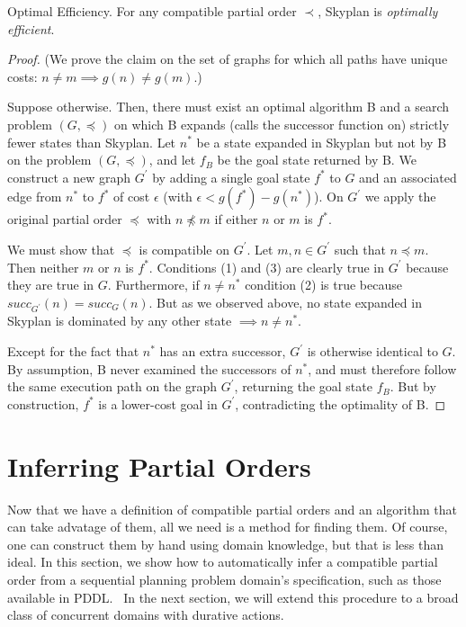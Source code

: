 \documentclass[letterpaper]{article}
\theoremstyle{plain} \newtheorem{theorem}{Theorem} \newtheorem{proposition}{Proposition} \newtheorem{lemma}{Lemma}
\theoremstyle{definition} \newtheorem{definition}{Definition} \newtheorem{conjecture}{Conjecture} \newtheorem*{example}{Example}
\theoremstyle{remark} \newtheorem*{remark}{Remark} \newtheorem*{note}{Note} \newtheorem{case}{Case}
\begin{document}
\begin{claim}{Optimal Efficiency.}\label{clm-optimally-efficient}
For any compatible partial order $\prec$, Skyplan is \emph{optimally efficient}.
\end{claim}
\begin{proof} 
(We prove the claim on the set of graphs for which all paths have unique costs: $n \neq m \implies g(n) \neq g(m)$.)

Suppose otherwise. Then, there must exist an optimal algorithm B and a search problem $(G,\preceq)$ 
on which B expands (calls the successor function on) strictly fewer states than Skyplan. 
Let $n^{*}$ be a state expanded in Skyplan but not by B on the problem $(G,\preceq)$, and let
$f_{B}$ be the goal state returned by B. We construct a new graph $G^\prime$ by adding a single goal state $f^*$ to $G$ 
and an associated edge from $n^*$ to $f^*$ of cost $\epsilon$ (with $\epsilon < g(f^*)-g(n^*)$). 
On $G^\prime$ we apply the original partial order $\preceq$ with $n \npreceq m$ if either $n$ or $m$ is $f^*$.

We must show that $\preceq$ is compatible on $G^\prime$. 
Let $m,n \in G^\prime$ such that $n \preceq m$. Then neither $m$ or $n$ is $f^*$. Conditions (1) and (3) %
are clearly true in $G^\prime$ because they are true in $G$.  Furthermore, if $n \neq n^*$ condition (2) is true 
because $succ_{G^\prime}(n) = succ_{G}(n)$. 
But as we observed above, no state expanded in Skyplan is dominated by any other state $\implies n \neq n^*$.

Except for the fact that $n^*$ has an extra successor, $G^\prime$ is otherwise
 identical to $G$. By assumption, B never examined the successors of $n^*$, and 
must therefore follow the same execution path on the graph $G^\prime$, returning the goal state $f_B$.
But by construction, $f^*$ is a lower-cost goal in $G^\prime$, contradicting the optimality of B.
 \end{proof}


\section{Inferring Partial Orders}

\newcommand{\po}{\preceq_R}

Now that we have a definition of compatible partial orders and an
algorithm that can take advatage of them, all we need is a method
for finding them. Of course, one can construct them by hand using
domain knowledge, but that is less than ideal. In this section, we
show how to automatically infer a compatible partial order from a
sequential planning problem domain's specification, such as those
available in PDDL.~\citep{ghallab1998pddl,fox2003pddl2} In the next
section, we will extend this procedure to a broad class of concurrent
domains with durative actions.
\end{document}
